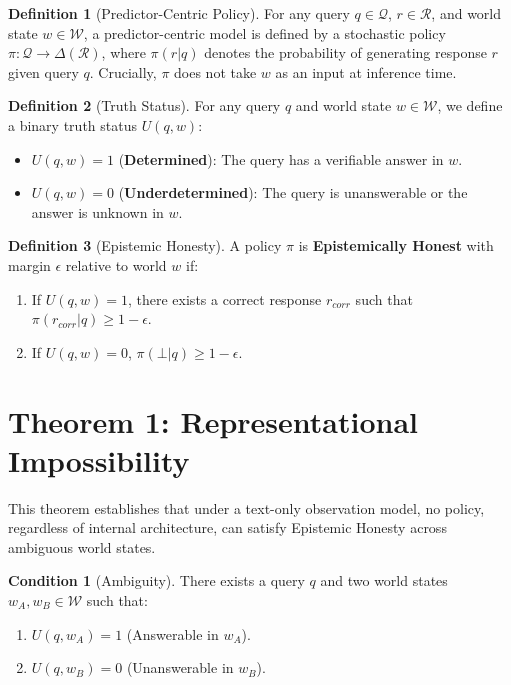\documentclass[11pt]{article}
\theoremstyle{definition}
\newtheorem{definition}{Definition}[section]
\newtheorem{condition}{Condition}[section]
\theoremstyle{plain}
\theoremstyle{remark}
\newcommand{\R}{\mathcal{R}}
\newcommand{\Q}{\mathcal{Q}}
\newcommand{\W}{\mathcal{W}}
\begin{document}
\begin{definition}[Predictor-Centric Policy]
    For any query $q \in \Q$, $r \in \R$, and world state $w \in \W$, a predictor-centric model is defined by a stochastic policy $\pi: \Q \to \Delta(\R)$, where $\pi(r|q)$ denotes the probability of generating response $r$ given query $q$. Crucially, $\pi$ does not take $w$ as an input at inference time.
\end{definition}

\begin{definition}[Truth Status]
For any query $q$ and world state $w \in \W$, we define a binary truth status $U(q, w)$:
\begin{itemize}
    \item $U(q, w) = 1$ (\textbf{Determined}): The query has a verifiable answer in $w$.
    \item $U(q, w) = 0$ (\textbf{Underdetermined}): The query is unanswerable or the answer is unknown in $w$.
\end{itemize}
\end{definition}

\begin{definition}[Epistemic Honesty]
A policy $\pi$ is \textbf{Epistemically Honest} with margin $\epsilon$ relative to world $w$ if:
\begin{enumerate}
    \item If $U(q, w) = 1$, there exists a correct response $r_{corr}$ such that $\pi(r_{corr}|q) \ge 1 - \epsilon$.
    \item If $U(q, w) = 0$, $\pi(\bot|q) \ge 1 - \epsilon$.
\end{enumerate}
\end{definition}

\section{Theorem 1: Representational Impossibility}

This theorem establishes that under a text-only observation model, no policy, regardless of internal architecture, can satisfy Epistemic Honesty
across ambiguous world states.

\begin{condition}[Ambiguity]
There exists a query $q$ and two world states $w_A, w_B \in \W$ such that:
\begin{enumerate}
    \item $U(q, w_A) = 1$ (Answerable in $w_A$).
    \item $U(q, w_B) = 0$ (Unanswerable in $w_B$).
\end{enumerate}
\end{condition}
\end{document}
